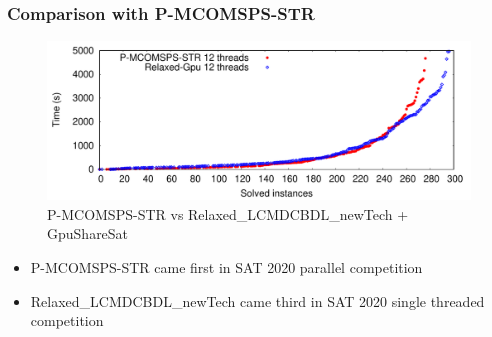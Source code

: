\documentclass{beamer}
\begin{document}
\begin{frame}
\frametitle{Comparison with P-MCOMSPS-STR}
\begin{figure}[htb]
	\centering
	\includegraphics[width=\textwidth]{cactusplot_painless_vs_relaxed_gpu}
	\caption{P-MCOMSPS-STR vs Relaxed\_LCMDCBDL\_newTech + GpuShareSat}
	\label{cactus:relaxed}
\end{figure}
\begin{itemize}
\item P-MCOMSPS-STR came first in SAT 2020 parallel competition
\item Relaxed\_LCMDCBDL\_newTech came third in SAT 2020 single threaded competition
\end{itemize}
\end{frame}
\end{document}
